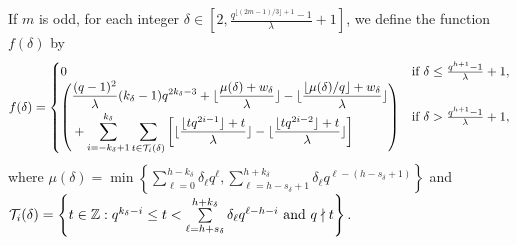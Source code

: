 \documentclass[journal,onecolumn]{IEEEtran}
\begin{document}
If $m$ is odd,  for each integer $\delta\in \left[2, \frac{q^{\lfloor (2m-1)/3\rfloor+1}-1}{\lambda}+1\right]$, we define the function $f(\delta)$ by 
\begin{equation} \label{ff}
f(\delta)=
\begin{cases}                  
0  &    \hbox{if }
\delta \leq \frac{q^{h+1}-1}{\lambda}+1, \\
 { \left(\begin{aligned}&\frac{ (q-1)^2}{\lambda}(k_{\delta}-1)q^{2k_{\delta}-3}+\lfloor \frac{\mu(\delta)+w_{\delta}}{\lambda}\rfloor -\lfloor \frac{\lfloor \mu(\delta)/q\rfloor+w_{\delta}}{\lambda}\rfloor \\
 &+ \sum\limits_{i=-k_{\delta}+1}^{k_{\delta}}\sum\limits_{t\in \mathcal{T}_i(\delta)} \left [\lfloor \frac{\lfloor tq^{2i-1}\rfloor+t}{\lambda}\rfloor -\lfloor \frac{\lfloor tq^{2i-2}\rfloor+t}{\lambda}\rfloor \right]
  \end{aligned}\right)} &\hbox{if }
\delta >\frac{q^{h+1}-1}{\lambda}+1,  
\end{cases}
\end{equation}
where $\mu(\delta)=\min\left \{\sum\limits_{\ell=0}^{h-k_{\delta}}\delta_{\ell}q^{\ell}, \sum\limits_{\ell=h-s_{\delta}+1}^{h+k_{\delta}}\delta_{\ell}q^{\ell-(h-s_{\delta}+1)}  \right\}$ and $\mathcal{T}_i(\delta)=\left\{t\in \mathbb{Z}: q^{k_{\delta}-i} \leq t  < \sum\limits_{\ell=h+s_{\delta}}^{h+k_{\delta}}\delta_{\ell}q^{\ell-h-i}\hbox{ and }q\nmid t\right\}. 
$
\end{document}

